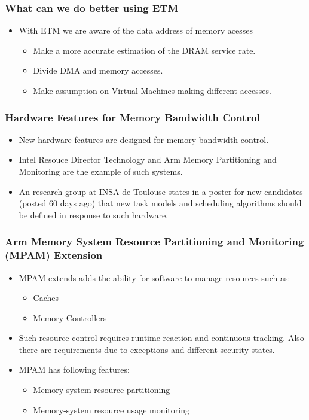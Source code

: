 \documentclass{beamer}
\begin{document}
\begin{frame}
    \frametitle{What can we do better using ETM}
    \begin{itemize}
        \item With ETM we are aware of the data address of memory acesses
            \begin{itemize}
                \item Make a more accurate estimation of the DRAM service rate.
                \item Divide DMA and memory accesses.
                \item Make assumption on Virtual Machines making different
                    accesses.
            \end{itemize}
    \end{itemize}
\end{frame}

\begin{frame}
    \frametitle{Hardware Features for Memory Bandwidth Control}
    \begin{itemize}
        \item New hardware features are designed for memory bandwidth control.
        \item Intel Resouce Director Technology and Arm Memory Partitioning
            and Monitoring are the example of such systems.
        \item An research group at INSA de Toulouse states in a poster for new
            candidates (posted 60 days ago) that new task models and scheduling
            algorithms should be defined in response to such hardware.
    \end{itemize}
\end{frame}

\begin{frame}
    \frametitle{Arm Memory System Resource Partitioning and Monitoring (MPAM)
    Extension}
    \begin{itemize}
        \item MPAM extends adds the ability for software to manage resources
            such as:
            \begin{itemize}
                \item Caches
                \item Memory Controllers
            \end{itemize}
        \item Such resource control requires runtime reaction and continuous
            tracking. Also there are requirements due to execptions and
            different security states.
        \item MPAM has following features:
            \begin{itemize}
                \item Memory-system resource partitioning
                \item Memory-system resource usage monitoring
            \end{itemize}
    \end{itemize}
\end{frame}
\end{document}
